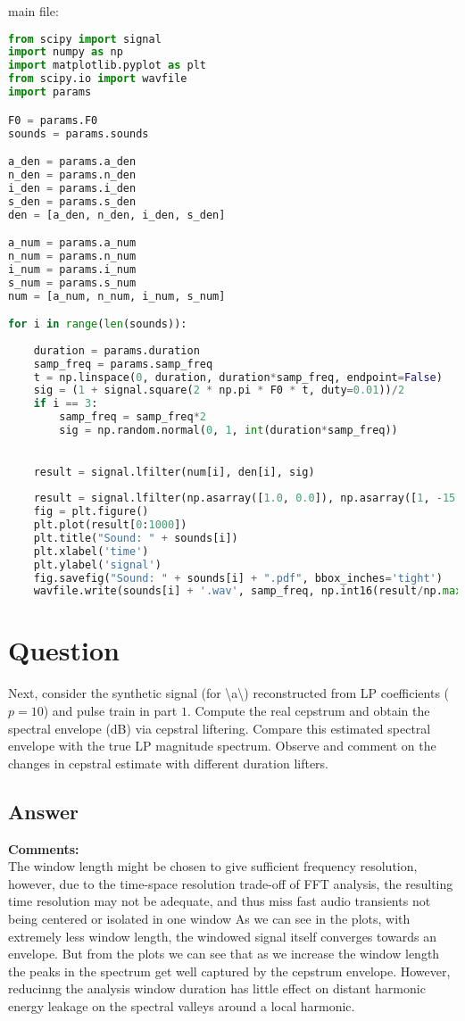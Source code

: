 \documentclass[a4paper]{article}
\begin{document}
main file: 
\begin{lstlisting}[language=Python, caption=q1.py]
from scipy import signal
import numpy as np
import matplotlib.pyplot as plt
from scipy.io import wavfile
import params

F0 = params.F0
sounds = params.sounds

a_den = params.a_den
n_den = params.n_den
i_den = params.i_den
s_den = params.s_den
den = [a_den, n_den, i_den, s_den]

a_num = params.a_num
n_num = params.n_num
i_num = params.i_num
s_num = params.s_num
num = [a_num, n_num, i_num, s_num]

for i in range(len(sounds)):
    
    duration = params.duration
    samp_freq = params.samp_freq
    t = np.linspace(0, duration, duration*samp_freq, endpoint=False)
    sig = (1 + signal.square(2 * np.pi * F0 * t, duty=0.01))/2
    if i == 3:
        samp_freq = samp_freq*2
        sig = np.random.normal(0, 1, int(duration*samp_freq))

    
    result = signal.lfilter(num[i], den[i], sig)
    
    result = signal.lfilter(np.asarray([1.0, 0.0]), np.asarray([1, -15.0/16.0]), result)
    fig = plt.figure()
    plt.plot(result[0:1000])
    plt.title("Sound: " + sounds[i])
    plt.xlabel('time')
    plt.ylabel('signal')
    fig.savefig("Sound: " + sounds[i] + ".pdf", bbox_inches='tight')
    wavfile.write(sounds[i] + '.wav', samp_freq, np.int16(result/np.max(result)*32767))
\end{lstlisting}

\section{Question}
Next, consider the synthetic signal (for \textbackslash a\textbackslash) reconstructed from LP coefficients ($p=10$) and pulse train in part $1$. Compute the real cepstrum and obtain the spectral envelope (dB) via cepstral liftering. Compare this estimated spectral envelope with the true LP magnitude spectrum. Observe and comment on the changes in cepstral estimate with different duration lifters.

\subsection{Answer}
\textbf{Comments:} \\ 
The window length might be chosen to give sufficient frequency resolution, however, due to the time-space resolution trade-off of FFT analysis, the resulting time resolution may not be adequate, and thus miss fast audio transients not being centered or isolated in one window
As we can see in the plots, with extremely less window length, the windowed signal itself converges towards an envelope. 
But from the plots we can see that as we increase the window length the peaks in the spectrum get well captured by the cepstrum envelope. 
However, reducinng the analysis window duration has little effect on distant harmonic energy leakage on the spectral valleys around a local harmonic. 
\end{document}
